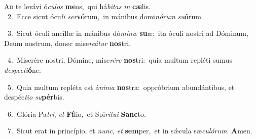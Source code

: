 \lettrine{\initial\textcolor{\initialcolor}{A}}{d} te levávi ó\-\textit{cu}\-\textit{los} \textbf{me}\-os,~\star qui há\-\textit{bi}\-\textit{tas} \textit{in} \textbf{cæ}\-lis.\\
{\numbfont\textcolor{\numbcolor}{~2.}}~Ecce sicut ócu\textit{li} \textit{ser}\-\textbf{vó}rum,~\star in mánibus domi\-\textit{nó}\-\textit{rum} \textit{su}\-\textbf{ó}rum.\par
{\numbfont\textcolor{\numbcolor}{~3.}}~Sicut óculi ancíllæ in mánibus dó\-\textit{mi}\-\textit{næ} \textbf{su}\-æ:~\star ita óculi nostri ad Dóminum, Deum nostrum, donec mise\-\textit{re}\-\textit{á}\textit{tur} \textbf{nos}\-tri.\par
{\numbfont\textcolor{\numbcolor}{~4.}}~Miserére nostri, Dómine, mise\-\textit{ré}\-\textit{re} \textbf{nos}\-tri:~\star quia multum repléti sumus \textit{de}\-\textit{spec}\textit{ti}\textbf{ó}ne:\par
{\numbfont\textcolor{\numbcolor}{~5.}}~Quia multum repléta est á\-\textit{ni}\-\textit{ma} \textbf{nos}\-tra:~\star oppróbrium abundántibus, et despéc\-\textit{ti}\-\textit{o} \textit{su}\-\textbf{pér}bis.\par
{\numbfont\textcolor{\numbcolor}{~6.}}~Glória Pa\-\textit{tri}\-, \textit{et} \textbf{Fí}\-lio,~\star et Spi\-\textit{rí}\-\textit{tu}\textit{i} \textbf{Sanc}\-to.\par
{\numbfont\textcolor{\numbcolor}{~7.}}~Sicut erat in princípio, et \textit{nunc}\-, \textit{et} \textbf{sem}\-per,~\star et in sǽcula sæ\-\textit{cu}\-\textit{ló}\textit{rum}. \textbf{A}\-men.\par

